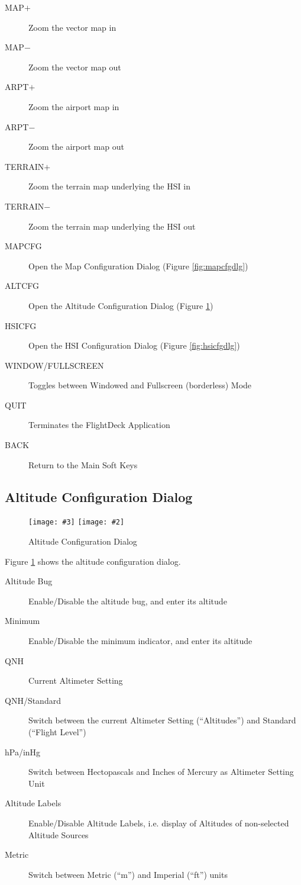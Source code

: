 \documentclass[a4paper,10pt,pdftex]{article}
\newcommand{\jnxfig}[3][]{\ifmypdf\texttt{[image: \#3]}
  \else\texttt{[image: \#2]}\fi}
\begin{document}
\begin{description}
\item[MAP$+$] Zoom the vector map in
\item[MAP$-$] Zoom the vector map out
\item[ARPT$+$] Zoom the airport map in
\item[ARPT$-$] Zoom the airport map out
\item[TERRAIN$+$] Zoom the terrain map underlying the HSI in
\item[TERRAIN$-$] Zoom the terrain map underlying the HSI out
\item[MAPCFG] Open the Map Configuration Dialog (Figure \ref{fig:mapcfgdlg})
\item[ALTCFG] Open the Altitude Configuration Dialog (Figure \ref{fig:altcfgdlg})
\item[HSICFG] Open the HSI Configuration Dialog (Figure \ref{fig:hsicfgdlg})
\item[WINDOW/FULLSCREEN] Toggles between Windowed and Fullscreen
  (borderless) Mode
\item[QUIT] Terminates the FlightDeck Application
\item[BACK] Return to the Main Soft Keys
\end{description}

\subsection{Altitude Configuration Dialog}

\begin{figure}[!htbp]
  \begin{center}
    \jnxfig[scale=0.5]{altcfgdlg.eps}{altcfgdlg.png}
    \caption{Altitude Configuration Dialog}
    \label{fig:altcfgdlg}
  \end{center}
\end{figure}

Figure \ref{fig:altcfgdlg} shows the altitude configuration dialog.

\begin{description}
\item[Altitude Bug] Enable/Disable the altitude bug, and enter its altitude
\item[Minimum] Enable/Disable the minimum indicator, and enter its altitude
\item[QNH] Current Altimeter Setting
\item[QNH/Standard] Switch between the current Altimeter Setting
  (``Altitudes'') and Standard (``Flight Level'')
\item[hPa/inHg] Switch between Hectopascals and Inches of Mercury as
  Altimeter Setting Unit
\item[Altitude Labels] Enable/Disable Altitude Labels, i.e. display of
  Altitudes of non-selected Altitude Sources
\item[Metric] Switch between Metric (``m'') and Imperial (``ft'') units
\end{description}
\end{document}

